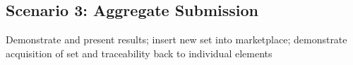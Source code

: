 \documentclass[10pt, conference, compsocconf]{IEEEtran}
\begin{document}
\subsection*{Scenario 3: Aggregate Submission}
Demonstrate and present results; insert new set into marketplace; demonstrate acquisition of set and traceability back to individual elements

%
%



%
%
\end{document}
